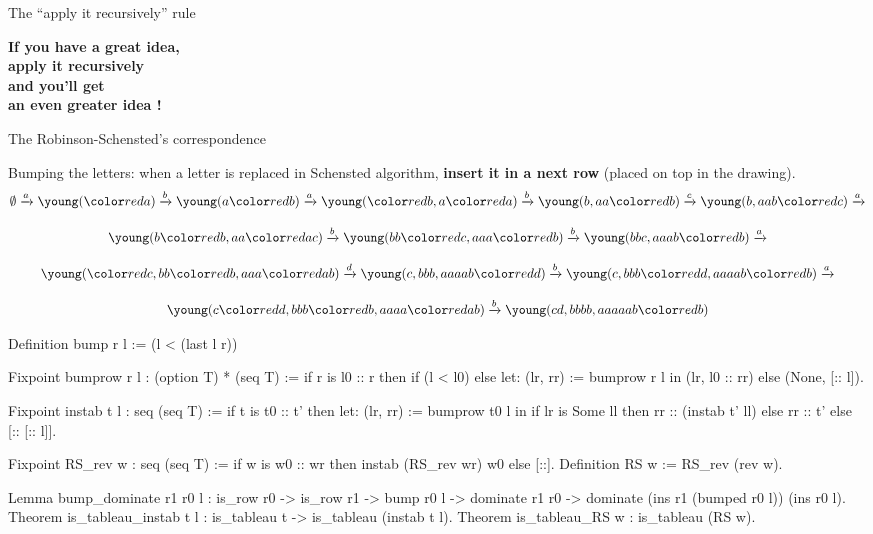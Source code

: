 \documentclass[compress,11pt]{beamer}
\renewcommand{\emph}[1]{{\color{red} #1}}
\begin{document}
\begin{frame}{The ``apply it recursively'' rule}

  \begin{block}
      \bf\huge\bf If you have a great idea,\\
      \pause
      \emph{apply it recursively} \\
      \pause
      and you'll get \\
      {\color{green} an even greater idea} !
  \end{block}
\end{frame}

\begin{frame}[fragile]{The Robinson-Schensted's correspondence}

  {\color{blue}Bumping the letters}: when a letter is replaced in Schensted
  algorithm, \textbf{insert it in a next row} (placed on top in the drawing).
  \newcommand{\ra}{{\red a}}%
  \newcommand{\rb}{{\red b}}%
  \newcommand{\rc}{{\red c}}%
  \newcommand{\rd}{{\red d}}%
  \begin{multline*}
  \emptyset\ar{a}\young(\ra )\ar{b}\young(a\rb)\ar{a}\young(\rb,a\ra)\ar{b}\young(b,aa\rb)
  \ar{c}\young(b,aab\rc)\ar{a}\\[3mm]
  \young(b\rb,aa\ra c)\ar{b}\young(bb\rc,aaa\rb)\ar{b}\young(bbc,aaab\rb)\ar{a}\\[3mm]
  \young(\rc,bb\rb,aaa\ra b)\ar{d}
  \young(c,bbb,aaaab\rd)\ar{b}\young(c,bbb\rd,aaaab\rb)\ar{a}\\[3mm]
  \young(c\rd,bbb\rb,aaaa\ra b)\ar{b}\young(cd,bbbb,aaaaab\rb)
  \end{multline*}
\end{frame}

\begin{frame}[fragile]
  \begin{coqcode}
Definition bump r l := (l < (last l r))%

Fixpoint bumprow r l : (option T) * (seq T) :=
  if r is l0 :: r then
    if (l < l0)%
    else let: (lr, rr) := bumprow r l in (lr, l0 :: rr)
  else (None, [:: l]).

Fixpoint instab t l : seq (seq T) :=
  if t is t0 :: t' then
    let: (lr, rr) := bumprow t0 l in
    if lr is Some ll then rr :: (instab t' ll) else rr :: t'
  else [:: [:: l]].

Fixpoint RS_rev w : seq (seq T) :=
  if w is w0 :: wr then instab (RS_rev wr) w0 else [::].
Definition RS w := RS_rev (rev w).

Lemma bump_dominate r1 r0 l : is_row r0 -> is_row r1 -> bump r0 l ->
  dominate r1 r0 -> dominate (ins r1 (bumped r0 l)) (ins r0 l).
Theorem is_tableau_instab t l : is_tableau t -> is_tableau (instab t l).
Theorem is_tableau_RS w : is_tableau (RS w).
  \end{coqcode}
\end{frame}
\end{document}

